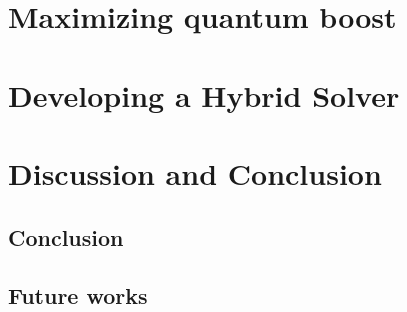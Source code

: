 \documentclass[11pt, oneside]{book}
\begin{document}








\part{Maximizing quantum boost}





\part{Developing a Hybrid Solver}







\part{Discussion and Conclusion}

\chapter{Conclusion}

\chapter{Future works}

\printbibliography
\end{document}
